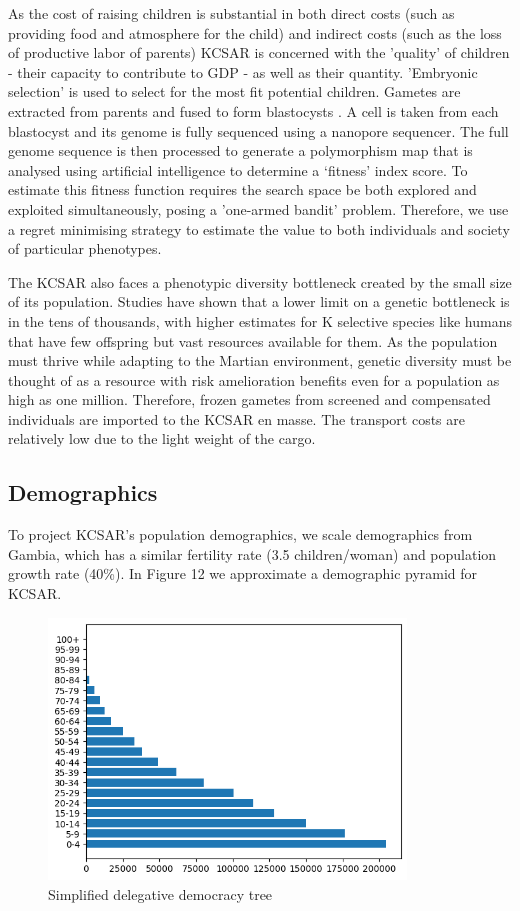 \documentclass[fleqn,10pt]{Stylesheet} %
\begin{document}
As the cost of raising children is substantial in both direct costs (such as providing food and atmosphere for the child) and indirect costs (such as the loss of productive labor of parents) KCSAR is concerned with the 'quality' of children - their capacity to contribute to GDP - as well as their quantity. 'Embryonic selection' is used to select for the most fit potential children. Gametes are extracted from parents and fused to form blastocysts \cite{Shulman}. A cell is taken from each blastocyst and its genome is fully sequenced using a nanopore sequencer. The full genome sequence is then processed to generate a polymorphism map that is analysed using artificial intelligence to determine a ‘fitness’ index score. To estimate this fitness function requires the search space be both explored and exploited simultaneously, posing a 'one-armed bandit' problem. Therefore, we use a regret minimising strategy to estimate the value to both individuals and society of particular phenotypes.

The KCSAR also faces a phenotypic diversity bottleneck created by the small size of its population. Studies have shown that a lower limit on a genetic bottleneck is in the tens of thousands, with higher estimates for K selective species like humans that have few offspring but vast resources available for them. As the population must thrive while adapting to the Martian environment, genetic diversity must be thought of as a resource with risk amelioration benefits even for a population as high as one million. Therefore, frozen gametes from screened and compensated individuals are imported to the KCSAR en masse. The transport costs are relatively low due to the light weight of the cargo.

\subsection{Demographics}
To project KCSAR's population demographics, we scale demographics from Gambia, which has a similar fertility rate (3.5 children/woman) and population growth rate (40\%). \cite{Gambia} In Figure 12 we approximate a demographic pyramid for KCSAR.

\begin{figure}
    \centering
    \includegraphics[width=95mm]{figures/fig_demopyr_t.png}
    \caption{Simplified delegative democracy tree}
\end{figure}
\end{document}

